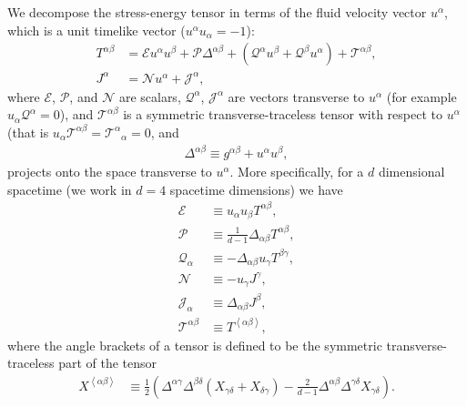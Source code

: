 \documentclass[12pt]{report}
\begin{document}
We decompose the stress-energy tensor in terms of
the fluid velocity vector $u^{\alpha}$, 
which is a unit timelike vector ($u^{\alpha}u_{\alpha}=-1$):
\begin{align}
    T^{\alpha\beta}
    &=
    \mathcal{E}u^{\alpha}u^{\beta}
    +
    \mathcal{P}\Delta^{\alpha\beta}
    +
    \left(\mathcal{Q}^{\alpha}u^{\beta} + \mathcal{Q}^{\beta}u^{\alpha}\right)
    +
    \mathcal{T}^{\alpha\beta}
    ,\\
    J^{\alpha}
    &=
    \mathcal{N}u^{\alpha}
    +
    \mathcal{J}^{\alpha}
    ,
\end{align}
where $\mathcal{E}$, $\mathcal{P}$, and $\mathcal{N}$ are scalars,
$\mathcal{Q}^{\alpha}$, $\mathcal{J}^{\alpha}$ are vectors transverse to $u^{\alpha}$
(for example $u_{\alpha}\mathcal{Q}^{\alpha}=0$),
and $\mathcal{T}^{\alpha\beta}$ is a symmetric transverse-traceless tensor
with respect to $u^{\alpha}$ (that is $u_{\alpha}\mathcal{T}^{\alpha\beta}=\mathcal{T}^{\alpha}{}_{\alpha}=0$,
and
\begin{align}
   \Delta^{\alpha\beta}
   \equiv
   g^{\alpha\beta}
   +
   u^{\alpha}u^{\beta}
   ,
\end{align}
projects onto the space transverse to $u^{\alpha}$.
More specifically, for a $d$ dimensional spacetime
(we work in $d=4$ spacetime dimensions) we have
\begin{subequations}
\begin{align}
   \mathcal{E}
   &\equiv
    u_{\alpha}u_{\beta}T^{\alpha\beta}
   ,\\
   \mathcal{P}
   &\equiv 
   \frac{1}{d-1}\Delta_{\alpha\beta}T^{\alpha\beta}
   ,\\
   \mathcal{Q}_{\alpha}
   &\equiv
   -
    \Delta_{\alpha\beta}u_{\gamma}T^{\beta\gamma}
   ,\\
   \mathcal{N}
   &\equiv
   -
    u_{\gamma}J^{\gamma}
   ,\\
   \mathcal{J}_{\alpha}
   &\equiv
   \Delta_{\alpha\beta}J^{\beta}
   ,\\
   \mathcal{T}^{\alpha\beta}
   &\equiv
   T^{\left<\alpha\beta\right>}
   ,
\end{align}
\end{subequations}
where the angle brackets of a tensor is defined to be
the symmetric transverse-traceless part of the tensor
\begin{align}
   X^{\left<\alpha\beta\right>}
   &\equiv
   \frac{1}{2}\left(
      \Delta^{\alpha\gamma}\Delta^{\beta\delta}
      \left(X_{\gamma\delta} + X_{\delta\gamma}\right)
      -
      \frac{2}{d-1}\Delta^{\alpha\beta}
      \Delta^{\gamma\delta}X_{\gamma\delta}
   \right)
   .
\end{align}
\end{document}
